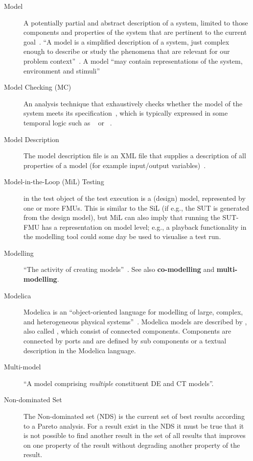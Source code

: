 \begin{description}
\item[Model] A potentially partial and abstract description of a system, limited to those components and properties of the system that are pertinent to the current goal~\cite{Holt&14}. ``A model is a simplified description of a system, just complex enough to describe or study the phenomena that are relevant for our problem context''~\cite{Amerongen10}. A model ``may contain representations of the system, environment and stimuli''~\cite{Fitzgerald&14c}

\item[Model Checking (MC)] An analysis technique that exhaustively checks whether the model of the system meets its specification~\cite{Clarke&99}, which is typically expressed in some temporal logic such as ~\cite{Pnueli77} or ~\cite{Clarke&81}.

\item[Model Description] The model description file is an XML file that supplies a description of all properties of a model (for example input/output variables)~\cite{FMIStandard2.0}.

\item[Model-in-the-Loop (MiL) Testing]  in  the test object of the test execution is a (design) model, represented by one or more FMUs. This is similar to the SiL (if e.g., the SUT is generated from the design model), but MiL can also imply that running the SUT-FMU has a representation on model level; e.g., a playback functionality in the modelling tool could some day be used to visualise a test run.

\item[Modelling] ``The activity of creating models''~\cite{Fitzgerald&14c}. See also \textbf{co-modelling} and \textbf{multi-modelling}.

\item[Modelica] Modelica is an ``object-oriented language for modelling of large, complex, and heterogeneous physical systems''~\cite{Fritzson&98}. Modelica models are described by , also called , which consist of connected components. Components are connected by ports and are defined by sub components or a textual description in the Modelica language.

\item[Multi-model] ``A model comprising \emph{multiple} constituent DE and CT models''.

\item[Non-dominated Set] The Non-dominated set (NDS) is the current set of best results according to a Pareto analysis.  For a result exist in the NDS it must be true that it is not possible to find another result in the set of all results that improves on one property of the result without degrading another property of the result.


\end{description}
